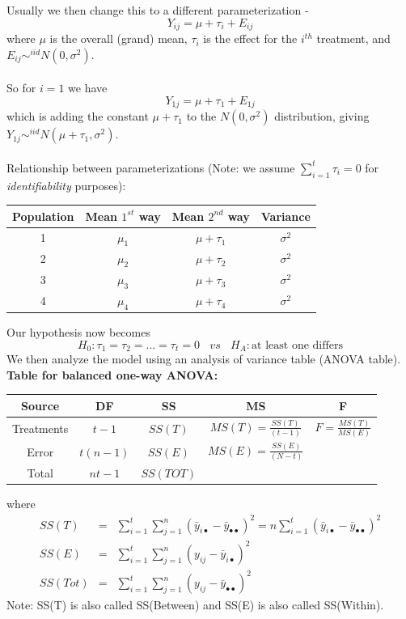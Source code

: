 Usually we then change this to a different parameterization -
$$Y_{ij}=\mu+\tau_{i}+E_{ij}$$
where $\mu$ is the overall (grand) mean, $\tau_i$ is the effect for the $i^{th}$ treatment, and $E_{ij}\sim^{iid}N(0,\sigma^2)$.\\~\\
So for $i=1$ we have
$$Y_{1j}=\mu+\tau_{1}+E_{1j}$$
which is adding the constant $\mu+\tau_1$ to the $N(0,\sigma^2)$ distribution, giving $Y_{1j}\sim^{iid}N(\mu+\tau_{1},\sigma^2)$.\\~\\

Relationship between parameterizations (Note: we assume $\sum_{i=1}^{t}\tau_i=0$ for \textit{identifiability} purposes):
\begin{center}
\begin{tabular}{c|ccc}
Population & Mean $1^{st}$ way & Mean $2^{nd}$ way & Variance\\\hline
1 & $\mu_{1}$ & $\mu+\tau_{1}$ & $\sigma^2$\\
2 & $\mu_{2}$ & $\mu+\tau_{2}$ & $\sigma^2$\\
3 & $\mu_{3}$ & $\mu+\tau_{3}$ & $\sigma^2$\\
4 & $\mu_{4}$ & $\mu+\tau_{4}$ & $\sigma^2$
\end{tabular}
\end{center}

Our hypothesis now becomes
$$H_0:\tau_1=\tau_2=...=\tau_t=0~~~~vs~~~~H_A: \mbox{at least one differs}$$
We then analyze the model using an analysis of variance table (ANOVA table).  
\textbf{Table for balanced one-way ANOVA:}
\begin{center}
\begin{tabular}{|c|c|c|c|c|} \hline
Source & DF & SS & MS & F \\ \hline
Treatments & $t-1$ & $SS(T)$ & $MS(T)=\frac{SS(T)}{(t-1)}$ & $F=\frac{MS(T)}{MS(E)}$ \\ 
Error & $t(n-1)$ & $SS(E)$ & $MS(E)=\frac{SS(E)}{(N-t)}$ & \\
Total & $nt-1$ & $SS(TOT)$ & &\\ \hline
\end{tabular}
\end{center}
where
\begin{eqnarray*}
SS(T) & = &\sum_{i=1}^{t} \sum_{j=1}^{n} (\bar{y}_{i\bullet} - \bar{y}_{\bullet\bullet})^2 = n\sum_{i=1}^{t}(\bar{y}_{i\bullet} - \bar{y}_{\bullet\bullet})^2\\
SS(E) & = & \sum_{i=1}^{t} \sum_{j=1}^{n}(y_{ij}-\bar{y}_{i\bullet})^2 \\
SS(Tot)&=& \sum_{i=1}^{t} \sum_{j=1}^{n}(y_{ij}-\bar{y}_{\bullet\bullet})^2
\end{eqnarray*}
Note:  SS(T) is also called SS(Between) and SS(E) is also called SS(Within).\\~\\

